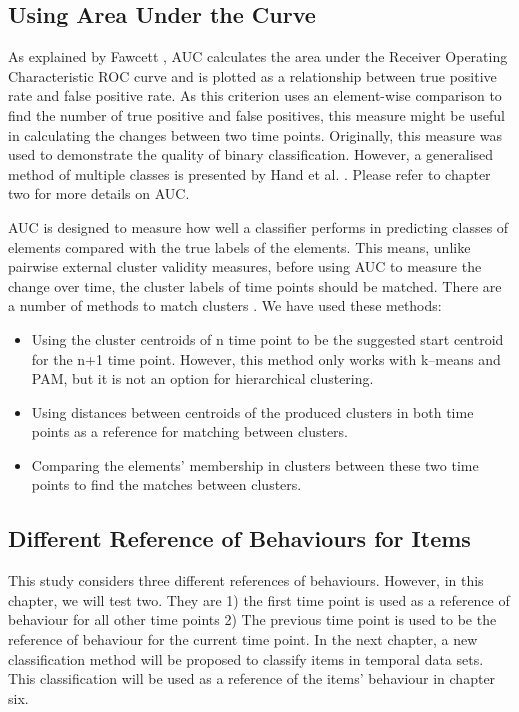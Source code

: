 \subsection{Using Area Under the Curve}

 As explained by Fawcett \cite{Fawcett2006}, AUC calculates the area under the Receiver Operating Characteristic ROC curve and is plotted as a relationship between true positive rate and false positive rate. As this criterion uses an element-wise comparison to find the number of true positive and false positives, this measure might be useful in calculating the changes between two time points. Originally, this measure was used to demonstrate the quality of binary classification. However, a generalised method of multiple classes is presented by Hand et al. \cite{Hand2001}. Please refer to chapter two for more details on AUC.
         
AUC is designed to measure how well a classifier performs in predicting classes of elements compared with the true labels of the elements. This means, unlike pairwise external cluster validity measures, before using AUC to measure the change over time, the cluster labels of time points should be matched. There are a number of methods to match clusters \cite{Rezaei2016,Halkidi2002a}. We have used these methods:
         
\begin{itemize}
    \item Using the cluster centroids of n time point to be the suggested start centroid for the n+1 time point. However, this method only works with k--means and PAM, but it is not an option for hierarchical clustering.
    \item Using distances between centroids of the produced clusters in both time points as a reference for matching between clusters.
    \item Comparing the elements' membership in clusters between these two time points to find the matches between clusters.
\end{itemize}
         
 \subsection{Different Reference of Behaviours for Items}
 \label{sec:DifferentReferenceofBehavioursforItems}
         
This study considers three different references of behaviours.  However, in this chapter,  we will test two. They are  1) the first time point is used as a reference of behaviour for all other time points 2) The previous time point is used to be the reference of behaviour for the current time point. In the next chapter, a new classification method will be proposed to classify items in temporal data sets. This classification will be used as a reference of the items' behaviour in chapter six.
         
